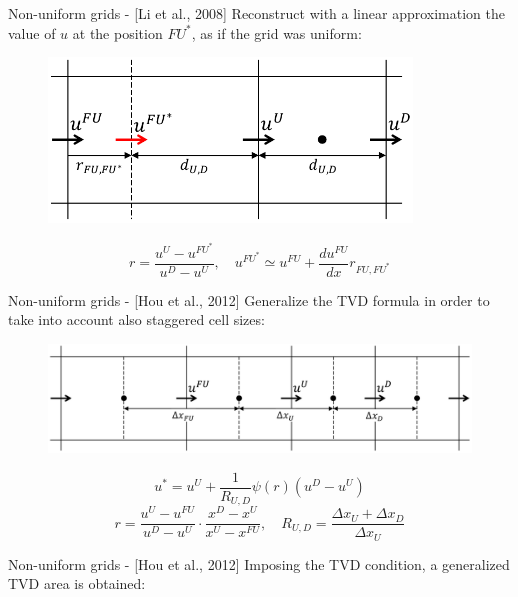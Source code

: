 \documentclass{beamer}
\begin{document}
\begin{frame}{Non-uniform grids - [Li et al., 2008]}
Reconstruct with a linear approximation the value of $u$ at the position 
$FU^*$, as if the grid was uniform:
\begin{figure}
	\centering
	\includegraphics[width=0.86\textwidth]{non_uniform_cells2.pdf}
\end{figure}
\begin{equation*}
r = \frac{u^U - u^{FU^*}}{u^D-u^U}, \quad u^{FU^*} \simeq u^{FU} + 
\frac{du^{FU}}{dx}r_{FU, FU^*}
\end{equation*}
\end{frame}
\begin{frame}{Non-uniform grids - [Hou et al., 2012]}
Generalize the TVD formula in order to take into account also staggered cell 
sizes:
\begin{figure}
	\centering
	\includegraphics[width=\textwidth]{cells_with_sizes.pdf}
\end{figure}
\begin{equation*}
	u^* = u^U + \frac{1}{R_{U,D}} \psi(r)(u^D-u^U)
\end{equation*}
\begin{equation*}
		r = \frac{u^U-u^{FU}}{u^D-u^U}\cdot\frac{x^D-x^U}{x^U-x^{FU}}, \quad 
		R_{U,D} 
		= \frac{\Delta x_U + \Delta x_D}{\Delta x_U}
\end{equation*}
\end{frame}
\begin{frame}{Non-uniform grids - [Hou et al., 2012]}
Imposing the TVD condition, a generalized TVD area is obtained:
\vspace{-0.3cm}
\begin{figure}
	\centering
	\hspace{-1.cm}
	
\end{figure}
\end{frame}
\end{document}
